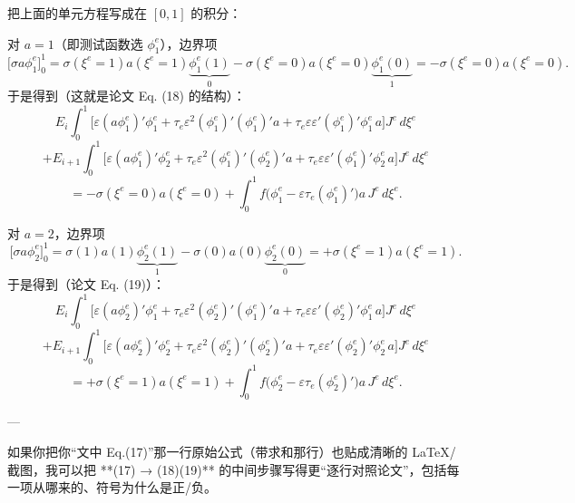 把上面的单元方程写成在 \([0,1]\) 的积分：

对 \(a=1\)（即测试函数选 \(\phi_1^e\)），边界项
\[
\Big[\sigma a\phi_1^e\Big]_{0}^{1}
=\sigma(\xi^e=1)a(\xi^e=1)\underbrace{\phi_1^e(1)}_{0}
-\sigma(\xi^e=0)a(\xi^e=0)\underbrace{\phi_1^e(0)}_{1}
=-\sigma(\xi^e=0)a(\xi^e=0).
\]
于是得到（这就是论文 Eq. (18) 的结构）：
\[
E_i\int_0^1
\Big[
\varepsilon (a\phi_1^e)'\phi_1^e
+\tau_e\varepsilon^2(\phi_1^e)'(\phi_1^e)'a
+\tau_e\varepsilon\varepsilon'(\phi_1^e)'\phi_1^e\,a
\Big]J^e\,d\xi^e
\]
\[
+
E_{i+1}\int_0^1
\Big[
\varepsilon (a\phi_1^e)'\phi_2^e
+\tau_e\varepsilon^2(\phi_1^e)'(\phi_2^e)'a
+\tau_e\varepsilon\varepsilon'(\phi_1^e)'\phi_2^e\,a
\Big]J^e\,d\xi^e
\]
\[
=
-\sigma(\xi^e=0)a(\xi^e=0)
+\int_0^1 f\Big(\phi_1^e-\varepsilon\tau_e(\phi_1^e)'\Big)a\,J^e\,d\xi^e.
\tag{18}
\]

对 \(a=2\)，边界项
\[
\Big[\sigma a\phi_2^e\Big]_{0}^{1}
=\sigma(1)a(1)\underbrace{\phi_2^e(1)}_{1}
-\sigma(0)a(0)\underbrace{\phi_2^e(0)}_{0}
=+\sigma(\xi^e=1)a(\xi^e=1).
\]
于是得到（论文 Eq. (19)）：
\[
E_i\int_0^1
\Big[
\varepsilon (a\phi_2^e)'\phi_1^e
+\tau_e\varepsilon^2(\phi_2^e)'(\phi_1^e)'a
+\tau_e\varepsilon\varepsilon'(\phi_2^e)'\phi_1^e\,a
\Big]J^e\,d\xi^e
\]
\[
+
E_{i+1}\int_0^1
\Big[
\varepsilon (a\phi_2^e)'\phi_2^e
+\tau_e\varepsilon^2(\phi_2^e)'(\phi_2^e)'a
+\tau_e\varepsilon\varepsilon'(\phi_2^e)'\phi_2^e\,a
\Big]J^e\,d\xi^e
\]
\[
=
+\sigma(\xi^e=1)a(\xi^e=1)
+\int_0^1 f\Big(\phi_2^e-\varepsilon\tau_e(\phi_2^e)'\Big)a\,J^e\,d\xi^e.
\tag{19}
\]

---

如果你把你“文中 Eq.(17)”那一行原始公式（带求和那行）也贴成清晰的 LaTeX/截图，我可以把 **(17) → (18)(19)** 的中间步骤写得更“逐行对照论文”，包括每一项从哪来的、符号为什么是正/负。